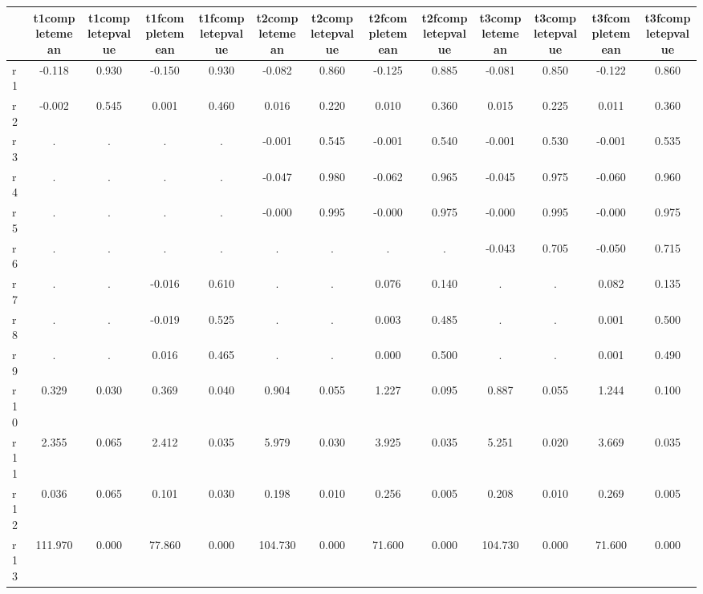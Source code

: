 \begin{table}[htbp]
\begin{tabular}{lcccccccccccc} \hline \hline
 & t1completemean  & t1completepvalue  & t1fcompletemean  & t1fcompletepvalue  & t2completemean  & t2completepvalue  & t2fcompletemean  & t2fcompletepvalue  & t3completemean  & t3completepvalue  & t3fcompletemean  & t3fcompletepvalue  \\  \hline 
r1 &    -0.118 &     0.930 &    -0.150 &     0.930 &    -0.082 &     0.860 &    -0.125 &     0.885 &    -0.081 &     0.850 &    -0.122 &     0.860 \\  
r2 &    -0.002 &     0.545 &     0.001 &     0.460 &     0.016 &     0.220 &     0.010 &     0.360 &     0.015 &     0.225 &     0.011 &     0.360 \\  
r3 &         . &         . &         . &         . &    -0.001 &     0.545 &    -0.001 &     0.540 &    -0.001 &     0.530 &    -0.001 &     0.535 \\  
r4 &         . &         . &         . &         . &    -0.047 &     0.980 &    -0.062 &     0.965 &    -0.045 &     0.975 &    -0.060 &     0.960 \\  
r5 &         . &         . &         . &         . &    -0.000 &     0.995 &    -0.000 &     0.975 &    -0.000 &     0.995 &    -0.000 &     0.975 \\  
r6 &         . &         . &         . &         . &         . &         . &         . &         . &    -0.043 &     0.705 &    -0.050 &     0.715 \\  
r7 &         . &         . &    -0.016 &     0.610 &         . &         . &     0.076 &     0.140 &         . &         . &     0.082 &     0.135 \\  
r8 &         . &         . &    -0.019 &     0.525 &         . &         . &     0.003 &     0.485 &         . &         . &     0.001 &     0.500 \\  
r9 &         . &         . &     0.016 &     0.465 &         . &         . &     0.000 &     0.500 &         . &         . &     0.001 &     0.490 \\  
r10 &     0.329 &     0.030 &     0.369 &     0.040 &     0.904 &     0.055 &     1.227 &     0.095 &     0.887 &     0.055 &     1.244 &     0.100 \\  
r11 &     2.355 &     0.065 &     2.412 &     0.035 &     5.979 &     0.030 &     3.925 &     0.035 &     5.251 &     0.020 &     3.669 &     0.035 \\  
r12 &     0.036 &     0.065 &     0.101 &     0.030 &     0.198 &     0.010 &     0.256 &     0.005 &     0.208 &     0.010 &     0.269 &     0.005 \\  
r13 &   111.970 &     0.000 &    77.860 &     0.000 &   104.730 &     0.000 &    71.600 &     0.000 &   104.730 &     0.000 &    71.600 &     0.000 \\  
\hline \hline \end{tabular}
\end{table}
